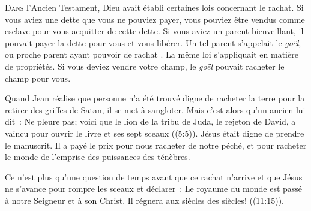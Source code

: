 \dvrule







\lettrine{D}{ans} l'Ancien Testament,
 Dieu avait établi certaines lois concernant le rachat.
 Si vous aviez une dette que vous ne pouviez payer,
 vous pouviez être vendus comme esclave pour vous acquitter
 de cette dette. Si vous aviez un parent bienveillant,
 il pouvait payer la dette pour vous et vous libérer.
 Un tel parent s'appelait le \emph{goël}, 
 ou \og proche parent ayant pouvoir de rachat \fg{}.
 La même loi s'appliquait en matière de propriétés.
 Si vous deviez vendre votre champ, le \emph{goël}
 pouvait racheter le champ pour vous. 

Quand Jean réalise que personne n'a été trouvé digne de racheter
 la terre pour la retirer des griffes de Satan, il se met à sangloter.
 Mais c'est alors qu'un ancien lui dit~: 
 \og Ne pleure pas; voici que le lion de la tribu de Juda,
 le rejeton de David, a vaincu pour ouvrir le livre et ses sept sceaux \fg{}
 ((5:5)).
 Jésus était digne de prendre le manuscrit. Il a payé le prix
 pour nous racheter de notre péché, et pour racheter le monde
 de l'emprise des puissances des ténèbres. 


Ce n'est plus qu'une question de temps avant que ce rachat n'arrive
 et que Jésus ne s'avance pour rompre les sceaux et déclarer~: 
 \og Le royaume du monde est passé à notre Seigneur et à son Christ.
 Il régnera aux siècles des siècles! \fg{} ((11:15)). 

\dvrule



